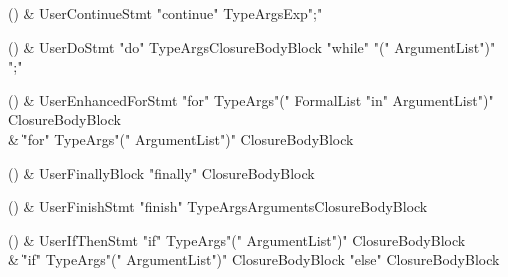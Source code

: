 \begin{bbgrammarappendix}{3.8in}

() & UserContinueStmt \label{prod:UserContinueStmt}  \:
 \xcd"continue" TypeArgs\opt Exp\opt \xcd";"

\end{bbgrammarappendix}

\begin{bbgrammarappendix}{3.8in}

() & UserDoStmt \label{prod:UserDoStmt}  \:
 \xcd"do" TypeArgs\opt ClosureBodyBlock \xcd"while" \xcd"(" ArgumentList\opt \xcd")" \xcd";"

\end{bbgrammarappendix}

\begin{bbgrammarappendix}{4.0in}

() & UserEnhancedForStmt \label{prod:UserEnhancedForStmt}  \:
 \xcd"for" TypeArgs\opt \xcd"(" FormalList \xcd"in" ArgumentList\opt \xcd")" ClosureBodyBlock \\
 &    \| \xcd"for" TypeArgs\opt \xcd"(" ArgumentList\opt \xcd")" ClosureBodyBlock

\end{bbgrammarappendix}

\begin{bbgrammarappendix}{3.8in}

() & UserFinallyBlock \label{prod:UserFinallyBlock}  \:
 \xcd"finally" ClosureBodyBlock

\end{bbgrammarappendix}

\begin{bbgrammarappendix}{3.8in}

() & UserFinishStmt \label{prod:UserFinishStmt}  \:
 \xcd"finish" TypeArgs\opt Arguments\opt ClosureBodyBlock

\end{bbgrammarappendix}

\begin{bbgrammarappendix}{4.4in}

() & UserIfThenStmt \label{prod:UserIfThenStmt}  \:
         \xcd"if" TypeArgs\opt \xcd"(" ArgumentList\opt \xcd")" ClosureBodyBlock \\
 &    \| \xcd"if" TypeArgs\opt \xcd"(" ArgumentList\opt \xcd")" ClosureBodyBlock \xcd"else" ClosureBodyBlock

\end{bbgrammarappendix}

